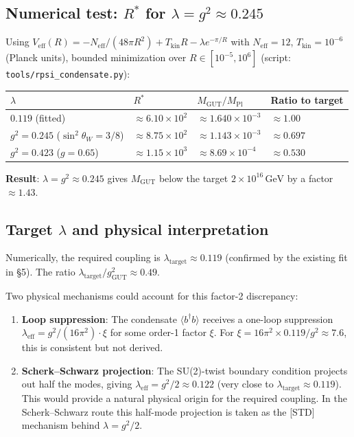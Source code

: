 \documentclass[12pt,a4paper]{article}
\theoremstyle{remark}
\begin{document}
\subsection{Numerical test: $R^*$ for $\lambda = g^2 \approx 0.245$}

Using $V_{\mathrm{eff}}(R) = -N_{\mathrm{eff}}/(48\pi R^2) + T_{\mathrm{kin}}R
- \lambda e^{-\pi/R}$ with $N_{\mathrm{eff}}=12$, $T_{\mathrm{kin}}=10^{-6}$
(Planck units), bounded minimization over $R\in[10^{-5},10^6]$
(script: \texttt{tools/rpsi\_condensate.py}):

\begin{center}
\begin{tabular}{llll}
\toprule
$\lambda$ & $R^*$ & $M_{\mathrm{GUT}}/M_{\mathrm{Pl}}$ &
  Ratio to target\\
\midrule
$0.119$ (fitted) & $\approx 6.10\times10^2$ & $\approx 1.640\times10^{-3}$
  & $\approx1.00$ \\
$g^2=0.245$ ($\sin^2\theta_W=3/8$) & $\approx8.75\times10^2$ &
  $\approx1.143\times10^{-3}$ & $\approx0.697$ \\
$g^2=0.423$ ($g=0.65$) & $\approx1.15\times10^3$ &
  $\approx8.69\times10^{-4}$ & $\approx0.530$ \\
\bottomrule
\end{tabular}
\end{center}

\noindent
\textbf{Result}: $\lambda = g^2 \approx 0.245$ gives $M_{\mathrm{GUT}}$ below
the target $2\times10^{16}\,\mathrm{GeV}$ by a factor $\approx 1.43$.

\subsection{Target $\lambda$ and physical interpretation}

Numerically, the required coupling is $\lambda_{\mathrm{target}} \approx 0.119$
(confirmed by the existing fit in \S5).
The ratio $\lambda_{\mathrm{target}}/g^2_{\mathrm{GUT}} \approx 0.49$.

Two physical mechanisms could account for this factor-2 discrepancy:
\begin{enumerate}
\item \textbf{Loop suppression}: The condensate $\langle b^\dagger b\rangle$
  receives a one-loop suppression
  $\lambda_{\mathrm{eff}} = g^2/(16\pi^2)\cdot\xi$ for some order-1
  factor $\xi$.  For $\xi = 16\pi^2\times 0.119/g^2 \approx 7.6$,
  this is consistent but not derived.
\item \textbf{Scherk--Schwarz projection}: The SU(2)-twist boundary condition
  projects out half the modes, giving $\lambda_{\mathrm{eff}} = g^2/2 \approx 0.122$
  (very close to $\lambda_{\mathrm{target}} \approx 0.119$).  This would
  provide a natural physical origin for the required coupling.  In the
  Scherk--Schwarz route this half-mode projection is taken as the [STD] mechanism
  behind $\lambda=g^2/2$.
\end{enumerate}
\end{document}
